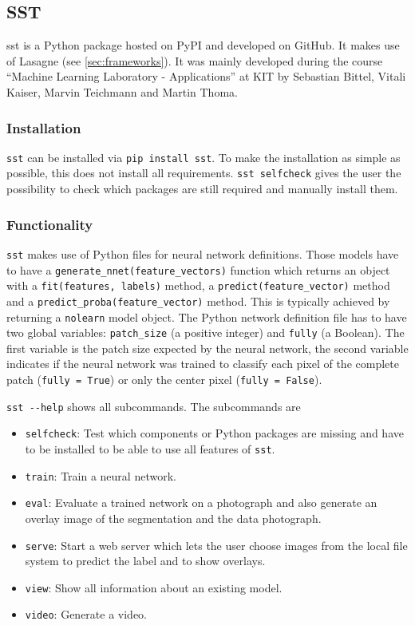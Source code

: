 
\subsection{SST}\label{sec:sst}
\Gls{sst} is a Python package hosted on \gls{PyPI} and developed on GitHub.
It makes use of Lasagne (see \cref{sec:frameworks}). It was mainly developed
during the course \enquote{Machine Learning Laboratory - Applications} at
KIT by Sebastian Bittel, Vitali Kaiser, Marvin Teichmann and Martin Thoma.

\subsubsection{Installation}
\verb+sst+ can be installed via \verb+pip install sst+. To make the
installation as simple as possible, this does not install all requirements.
\verb+sst selfcheck+ gives the user the possibility to check which packages
are still required and manually install them.

\subsubsection{Functionality}
\verb+sst+ makes use of Python files for neural network definitions. Those
models have to have a \verb+generate_nnet(feature_vectors)+ function which
returns an object with a \verb+fit(features, labels)+ method, a
\verb+predict(feature_vector)+ method and a
\verb+predict_proba(feature_vector)+ method. This is typically achieved by
returning a \verb+nolearn+ model object. The Python network definition file
has to have two global variables: \verb+patch_size+ (a positive integer) and
\verb+fully+ (a Boolean). The first variable is the patch size expected by the
neural network, the second variable indicates if the neural network was trained
to classify each pixel of the complete patch (\verb+fully = True+) or only the
center pixel (\verb+fully = False+).

\verb+sst --help+ shows all subcommands. The subcommands are

\begin{itemize}
    \item \verb+selfcheck+: Test which components or Python packages are
                            missing and have to be installed to be able to use
                            all features of \verb+sst+.
    \item \verb+train+: Train a neural network.
    \item \verb+eval+: Evaluate a trained network on a photograph and also
                       generate an overlay image of the segmentation and the
                       data photograph.
    \item \verb+serve+: Start a web server which lets the user choose images
                        from the local file system to predict the label and to
                        show overlays.
    \item \verb+view+: Show all information about an existing model.
    \item \verb+video+: Generate a video.
\end{itemize}